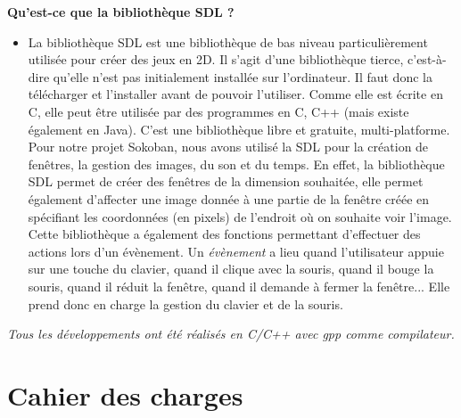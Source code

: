 \documentclass[english,11pt]{report}
\begin{document}
\textbf{Qu'est-ce que la bibliothèque SDL ?}
\vspace{0,15cm}
\begin{itemize}[label=]
    \item {La bibliothèque SDL est une bibliothèque de bas niveau particulièrement utilisée pour créer des jeux en 2D. Il s’agit d’une bibliothèque tierce, c’est-à-dire qu’elle n’est pas initialement installée sur l'ordinateur. Il faut donc la télécharger et l’installer avant de pouvoir l’utiliser. Comme elle est écrite en C,  elle peut être utilisée par des programmes en C, C++ (mais existe également en Java). C’est une bibliothèque libre et gratuite, multi-platforme.\\Pour notre projet Sokoban, nous avons utilisé la SDL pour la création de fenêtres, la gestion des images, du son et du temps. En effet, la bibliothèque SDL permet de créer des fenêtres de la dimension souhaitée, elle permet également d’affecter une image donnée à une partie de la fenêtre créée en spécifiant les coordonnées (en pixels) de l’endroit où on souhaite voir l’image.\\Cette bibliothèque a également des fonctions permettant d’effectuer des actions lors d’un évènement. Un \emph{évènement}  a lieu quand l'utilisateur appuie sur une touche du clavier, quand il clique avec la souris, quand il bouge la souris, quand il réduit la fenêtre, quand il demande à fermer la fenêtre... Elle prend donc en charge la gestion du clavier et de la souris.}
\end{itemize}
\vspace{0,5cm}
\textit{Tous les développements ont été réalisés en C/C++ avec \emph{gpp} comme compilateur. }

\chapter{Cahier des charges}
\end{document}
